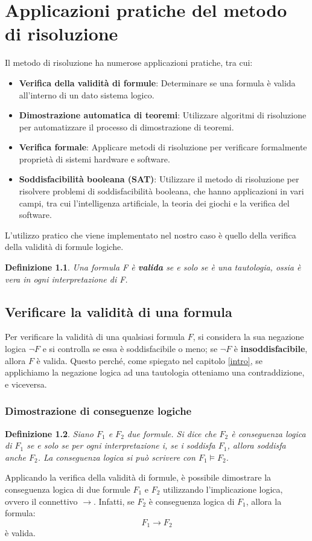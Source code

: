 \documentclass[a4paper,12pt]{report}
\newtheorem{definition}{Definizione}[section]
\begin{document}
% 
% 
\chapter{Applicazioni pratiche del metodo di risoluzione}
\label{app}
Il metodo di risoluzione ha numerose applicazioni pratiche, tra cui:
\begin{itemize}
    \item \textbf{Verifica della validità di formule}: Determinare se una formula è valida all'interno di un dato sistema logico.
    \item \textbf{Dimostrazione automatica di teoremi}: Utilizzare algoritmi di risoluzione per automatizzare il processo di dimostrazione di teoremi.
    \item \textbf{Verifica formale}: Applicare metodi di risoluzione per verificare formalmente proprietà di sistemi hardware e software.
    \item \textbf{Soddisfacibilità booleana (SAT)}: Utilizzare il metodo di risoluzione per risolvere problemi di soddisfacibilità booleana, che hanno applicazioni in vari campi, tra cui l'intelligenza artificiale, la teoria dei giochi e la verifica del software.
\end{itemize}
L'utilizzo pratico che viene implementato nel nostro caso è quello della verifica della validità di formule logiche.

\begin{definition}
    Una formula F è \textbf{valida} se e solo se è una tautologia, ossia è vera in ogni interpretazione di F.
\end{definition}

\section{Verificare la validità di una formula}
Per verificare la validità di una qualsiasi formula $F$, si considera la sua negazione logica $\lnot F$ e si controlla se essa è soddisfacibile o meno; se $\lnot F$ è \textbf{insoddisfacibile}, allora $F$ è valida. Questo perché, come spiegato nel capitolo \ref{intro}, se applichiamo la negazione logica ad una tautologia otteniamo una contraddizione, e viceversa.

\subsection{Dimostrazione di conseguenze logiche}

\begin{definition}
    Siano $F_1$ e $F_2$ due formule. Si dice che $F_2$ è conseguenza logica di $F_1$ se e solo se per ogni interpretazione i, se i soddisfa $F_1$, allora soddisfa anche $F_2$. La conseguenza logica si può scrivere con $F_1 \models F_2$.
\end{definition}
Applicando la verifica della validità di formule, è possibile dimostrare la conseguenza logica di due formule $F_1$ e $F_2$ utilizzando l'implicazione logica, ovvero il connettivo $\to$. Infatti, se $F_2$ è conseguenza logica di $F_1$, allora la formula:
\[
    F_1 \to F_2
\]
è valida.
\end{document}
